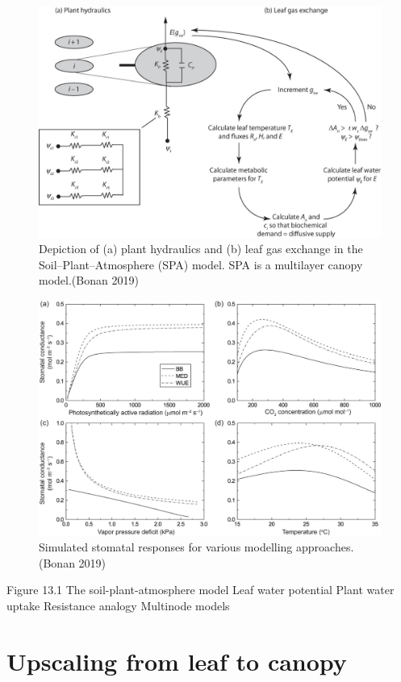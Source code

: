 \documentclass[
  oneside]{book}
\begin{document}
\begin{figure}

{\centering \includegraphics[width=0.8\linewidth]{figures/chap2/SPA} 

}

\caption{Depiction of (a) plant hydraulics and (b) leaf gas exchange in the Soil–Plant–Atmosphere (SPA) model. SPA is a multilayer canopy model.(Bonan 2019)}\label{fig:f219}
\end{figure}

\begin{figure}

{\centering \includegraphics[width=0.8\linewidth]{figures/chap2/modelling_approaches} 

}

\caption{Simulated stomatal responses for various modelling approaches. (Bonan 2019)}\label{fig:f220}
\end{figure}

Figure 13.1
The soil-plant-atmosphere model
Leaf water potential
Plant water uptake
Resistance analogy
Multinode models

\hypertarget{upscaling-from-leaf-to-canopy}{%
\section{Upscaling from leaf to canopy}\label{upscaling-from-leaf-to-canopy}}
\end{document}
